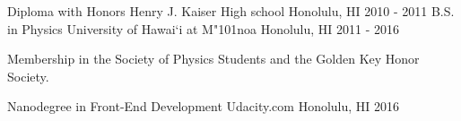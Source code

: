 \begin{cventries}
	 \cventry
	 {Diploma with Honors}
	 {Henry J. Kaiser High school}
	 {Honolulu, HI}
	 {2010 - 2011}
	 {}
  \cventry
    {B.S. in Physics}
    {University of Hawai`i at M{\char"101}noa}
    {Honolulu, HI}
    {2011 - 2016}
    {
      \begin{cvitems}
        \item {Membership in the Society of Physics Students and the Golden Key Honor Society.}
      \end{cvitems}
    }
    
  \cventry
  {Nanodegree in Front-End Development}
  {Udacity.com}
  {Honolulu, HI}
  {2016}
  {}    
\end{cventries}
